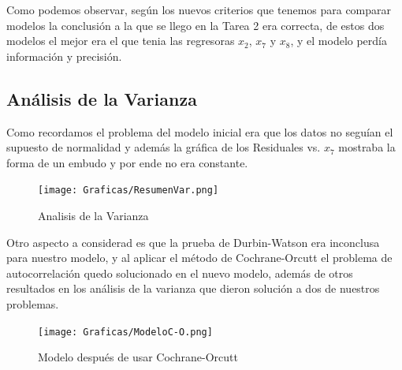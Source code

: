 \documentclass[11pt]{beamer}
\begin{document}
\begin{frame}
Como podemos observar, según los nuevos criterios que tenemos para comparar modelos la conclusión a la que se llego en la Tarea 2 era correcta, de estos dos modelos el mejor era el que tenia las regresoras $x_{2}$, $x_{7}$ y $x_{8}$, y el modelo perdía información y precisión.
\end{frame}

\subsection{Análisis de la Varianza}

\begin{frame}
\end{frame}

\begin{frame}

Como recordamos el problema del modelo inicial era que los datos no seguían el supuesto de normalidad y además la gráfica de los Residuales vs. $x_{7}$ mostraba la forma de un embudo y por ende no era constante. 

\end{frame}

\begin{frame}
\begin{figure}[hbtp]
\centering
\texttt{[image: Graficas/ResumenVar.png]}
\caption{Analisis de la Varianza}
\end{figure}

\end{frame}

\begin{frame}

Otro aspecto a considerad es que la prueba de Durbin-Watson era inconclusa para nuestro modelo, y al aplicar el método de Cochrane-Orcutt el problema de autocorrelación quedo solucionado en el nuevo modelo, además de otros resultados en los análisis de la varianza que dieron solución a dos de nuestros problemas.

\end{frame}

\begin{frame}

\begin{figure}[hbtp]
\centering
\texttt{[image: Graficas/ModeloC-O.png]}
\caption{Modelo después de usar Cochrane-Orcutt}
\end{figure}

\end{frame}
\end{document}
